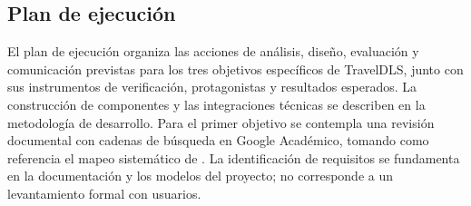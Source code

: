 \subsection{Plan de ejecución}
\label{sec:plan-ejecucion}

El plan de ejecución organiza las acciones de análisis, diseño, evaluación y comunicación previstas para los tres objetivos específicos de TravelDLS, junto con sus instrumentos de verificación, protagonistas y resultados esperados. La construcción de componentes y las integraciones técnicas se describen en la metodología de desarrollo. Para el primer objetivo se contempla una revisión documental con cadenas de búsqueda en Google Académico, tomando como referencia el mapeo sistemático de \textcite{petersen2008systematic}. La identificación de requisitos se fundamenta en la documentación y los modelos del proyecto; no corresponde a un levantamiento formal con usuarios.

